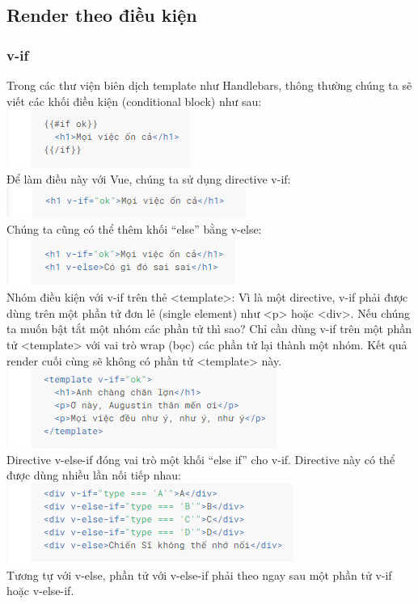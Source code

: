 \documentclass[12pt,a4paper]{report}
\begin{document}
\subsection{Render theo điều kiện}
\subsubsection{v-if}
Trong các thư viện biên dịch template như Handlebars, thông thường chúng ta sẽ viết các khối điều kiện (conditional block) như sau:\\\includegraphics[scale=1]{35}\\Để làm điều này với Vue, chúng ta sử dụng directive v-if:\\\includegraphics[scale=1]{36}\\Chúng ta cũng có thể thêm khối “else” bằng v-else:\\\includegraphics[scale=1]{37}\\Nhóm điều kiện với v-if trên thẻ <template>: Vì là một directive, v-if phải được dùng trên một phần tử đơn lẻ (single element) như <p> hoặc <div>. Nếu chúng ta muốn bật tắt một nhóm các phần tử thì sao? Chỉ cần dùng v-if trên một phần tử <template> với vai trò wrap (bọc) các phần tử lại thành một nhóm. Kết quả render cuối cùng sẽ không có phần tử <template> này.
\includegraphics[scale=1]{38}\\Directive v-else-if đóng vai trò một khối “else if” cho v-if. Directive này có thể được dùng nhiều lần nối tiếp nhau:\\\includegraphics[scale=1]{39}\\Tương tự với v-else, phần tử với v-else-if phải theo ngay sau một phần tử v-if hoặc v-else-if.
\end{document}
